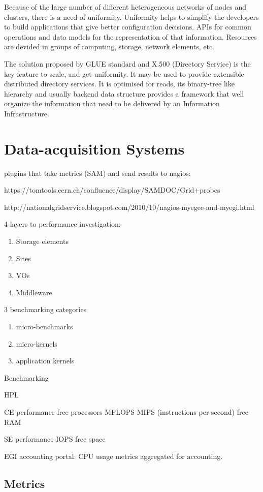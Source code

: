 Because of the large number of different heterogeneous networks of nodes and clusters, there is a need of uniformity. Uniformity helps to simplify the developers to build applications that give better configuration decisions. APIs for common operations and data models for the representation of that information. Resources are devided in groups of computing, storage, network elements, etc.

The solution proposed by GLUE standard and X.500 (Directory Service) is the key feature to scale, and get uniformity. It may be used to provide extensible distributed directory services. It is optimised for reads, its binary-tree like hierarchy and usually backend data structure provides a framework that well organize the information that need to be delivered by an Information Infrastructure.\cite{mds1}

\section{Data-acquisition Systems}
plugins that take metrics (SAM) and send results to nagios:

https://tomtools.cern.ch/confluence/display/SAMDOC/Grid+probes

http://nationalgridservice.blogspot.com/2010/10/nagios-myegee-and-myegi.html

4 layers to performance investigation:
\begin{enumerate}
  \item Storage elements
  \item Sites
  \item VOs
  \item Middleware
\end{enumerate}
3 benchmarking categories
\begin{enumerate}
  \item micro-benchmarks
  \item micro-kernels
  \item application kernels
\end{enumerate}
Benchmarking

HPL
\cite{gridbench}

CE performance
free processors
MFLOPS
MIPS (instructions per second)
free RAM

SE performance
IOPS
free space

EGI accounting portal: CPU usage metrics aggregated for accounting.

\subsection{Metrics}\label{subsec:metrics}


